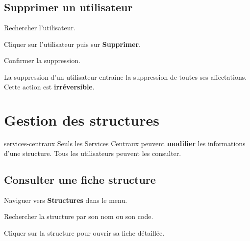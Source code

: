 \subsection{Supprimer un utilisateur}

\begin{steps}
  \item Rechercher l'utilisateur.
  \item Cliquer sur l'utilisateur puis sur \textbf{Supprimer}.
  \item Confirmer la suppression.
\end{steps}

\begin{warnbox}
  La suppression d'un utilisateur entra\^ine la suppression de toutes ses affectations. Cette action est \textbf{irr\'eversible}.
\end{warnbox}

\section{Gestion des structures}

\begin{rolebox}{services-centraux}
  Seuls les Services Centraux peuvent \textbf{modifier} les informations d'une structure. Tous les utilisateurs peuvent les consulter.
\end{rolebox}


\subsection{Consulter une fiche structure}

\begin{steps}
  \item Naviguer vers \textbf{Structures} dans le menu.
  \item Rechercher la structure par son nom ou son code.
  \item Cliquer sur la structure pour ouvrir sa fiche d\'etaill\'ee.
\end{steps}


